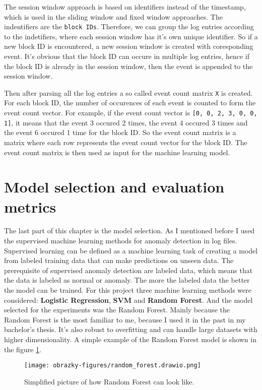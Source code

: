 The session window approach is based on identifiers instead of the timestamp, which is used in the sliding window and fixed window approaches. 
The indentifiers are the \texttt{block IDs}. Therefore, we can group the log entries according to the indetifiers, where each session window has it's own unique identifier.
So if a new block ID is encountered, a new session window is created with coresponding event. It's obvious that the block ID can occure in multiple log entries, hence if the block ID is already in the session window, then the event is appended to the session window.

Then after parsing all the log entries a so called event count matrix \texttt{X} is created. For each block ID, the number of occurences of each event is counted to form the event count vector.
For example, if the event count vector is \texttt{[0, 0, 2, 3, 0, 0, 1]}, it means that the event 3 occured 2 times, the event 4 occured 3 times and the event 6 occured 1 time for the block ID.
So the event count matrix is a matrix where each row represents the event count vector for the block ID. The event count matrix is then used as input for the machine learning model.

\section{Model selection and evaluation metrics} \label{model}

The last part of this chapter is the model selection. As I mentioned before I used the supervised machine learning methods for anomaly detection in log files. Supervised learning can be defined 
as a machine learning task of creating a model from labeled training data that can make predictions on unseen data.
The prerequisite of supervised anomaly detection are labeled data, which means that the data is labeled as normal or anomaly. The more the labeled data the better the model can be trained.
For this project three machine learning methods were considered: \textbf{Logistic Regression}, \textbf{SVM} and \textbf{Random Forest}. And the model selected for the experiments was the Random Forest.
Mainly because the Random Forest is the most familiar to me, because I used it in the past in my bachelor's thesis. It's also robust to overfitting and can handle large datasets with higher dimensionality.
A simple example of the Random Forest model is shown in the figure \ref{fig:random_forest}.

\begin{figure}
    \centering
    \texttt{[image: obrazky-figures/random\_forest.drawio.png]}
    \caption{Simplified picture of how Random Forest can look like.}
    \label{fig:random_forest}
\end{figure}

